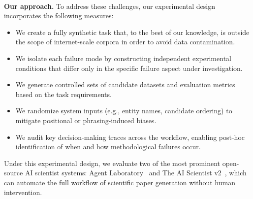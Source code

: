 \documentclass[10pt]{article}
\begin{document}
~\\\noindent\textbf{Our approach.} To address these challenges, our experimental design incorporates the following measures:
\begin{itemize}
\item We create a fully synthetic task that, to the best of our knowledge, is outside the scope of internet-scale corpora in order to avoid data contamination.
\item We isolate each failure mode by constructing independent experimental conditions that differ only in the specific failure aspect under investigation.
\item We generate controlled sets of candidate datasets and evaluation metrics based on the task requirements.
\item We randomize system inputs (e.g., entity names, candidate ordering) to mitigate positional or phrasing-induced biases.
\item We audit key decision-making traces across the workflow, enabling post-hoc identification of when and how methodological failures occur.
\end{itemize}
Under this experimental design, we evaluate two of the most prominent 
open-source AI scientist systems: Agent Laboratory~\citep{schmidgall2025agentlaboratoryusingllm} and The AI Scientist v2~\citep{yamada2025aiscientistv2workshoplevelautomated}, which can automate the full workflow of scientific paper generation without human intervention. 
\end{document}
